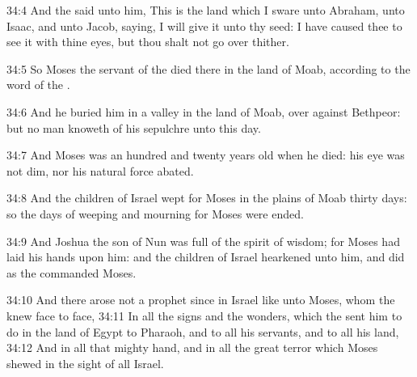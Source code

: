 34:4 And the \LORD said unto him, This is the land which I sware unto
Abraham, unto Isaac, and unto Jacob, saying, I will give it unto thy
seed: I have caused thee to see it with thine eyes, but thou shalt not
go over thither.

34:5 So Moses the servant of the \LORD died there in the land of Moab,
according to the word of the \LORD.

34:6 And he buried him in a valley in the land of Moab, over against
Bethpeor: but no man knoweth of his sepulchre unto this day.

34:7 And Moses was an hundred and twenty years old when he died: his
eye was not dim, nor his natural force abated.

34:8 And the children of Israel wept for Moses in the plains of Moab
thirty days: so the days of weeping and mourning for Moses were ended.

34:9 And Joshua the son of Nun was full of the spirit of wisdom; for
Moses had laid his hands upon him: and the children of Israel
hearkened unto him, and did as the \LORD commanded Moses.

34:10 And there arose not a prophet since in Israel like unto Moses,
whom the \LORD knew face to face, 34:11 In all the signs and the
wonders, which the \LORD sent him to do in the land of Egypt to
Pharaoh, and to all his servants, and to all his land, 34:12 And in
all that mighty hand, and in all the great terror which Moses shewed
in the sight of all Israel.

